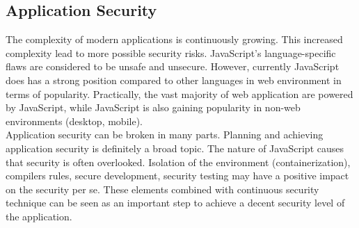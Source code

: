 \documentclass{article} %
\begin{document}
\subsection{Application Security}
The complexity of modern applications is continuously growing. This increased complexity lead to more possible security risks. JavaScript's language-specific flaws are considered to be unsafe and unsecure. However, currently JavaScript does has a strong position compared to other languages in web environment in terms of popularity. Practically, the vast majority of web application are powered by  JavaScript, while JavaScript is also gaining popularity in non-web environments (desktop, mobile).\\
\newline
Application security can be broken in many parts. Planning and achieving application security is definitely a broad topic. The nature of JavaScript causes that security is often overlooked. Isolation of the environment (containerization), compilers rules, secure development, security testing may have a positive impact on the security per se. These elements combined with continuous security technique can be seen as an important step to achieve a decent security level of the application.
\end{document}
